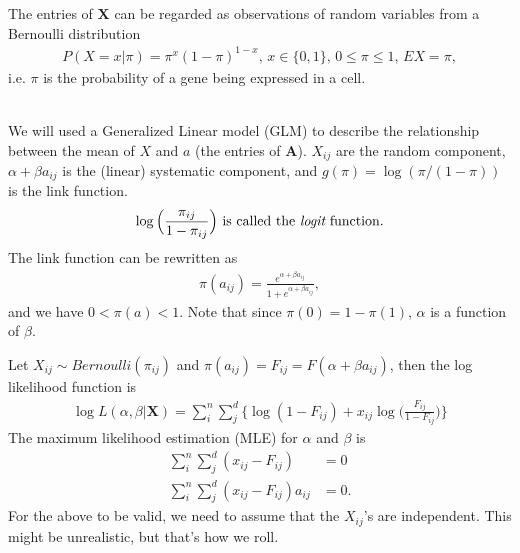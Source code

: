 \documentclass[12pt]{article}
\begin{document}
The entries of $\mathbf{X}$ can be regarded as observations of random variables from a Bernoulli distribution
\begin{align*}
  P(X = x|\pi) = \pi^x(1-\pi)^{1-x}, \, x \in \{0, 1\}, \, 0 \leq \pi \leq 1, \, EX = \pi, 
\end{align*}
i.e. $\pi$ is the probability of a gene being expressed in a cell. 

\vspace{3mm}

 \\
We will used a Generalized Linear model (GLM) to describe the relationship between the mean of $X$ and $a$ (the entries of $\mathbf{A}$).
$X_{ij}$ are the random component, $\alpha + \beta a_{ij}$ is the (linear) systematic component, and $g(\pi) = \log(\pi/(1-\pi))$ is the link function. 
\begin{align}
  \log \Big ( \frac{\pi_{ij}}{1-\pi_{ij}} \Big) \text{ is called the {\it logit} function.}
\end{align}
The link function can be rewritten as
\begin{align}
  \pi(a_{ij}) =  \frac{e^{\alpha+\beta a_{ij}}}{1+e^{\alpha+\beta a_{ij}}}, 
\end{align}
and we have $0 < \pi(a) < 1$.
Note that since $\pi(0) = 1-\pi(1)$, $\alpha$ is a function of $\beta$.


Let $X_{ij} \sim Bernoulli(\pi_{ij})$ and $\pi(a_{ij}) = F_{ij} = F(\alpha + \beta a_{ij})$, then the log likelihood function is
\begin{align}
  \log L(\alpha, \beta| \mathbf{X}) = \sum_{i}^{n} \sum_{j}^{d} \Big \{ \log (1-F_{ij}) + x_{ij} \log \big (\frac{F_{ij}}{1 - F_{ij}} \big ) \Big \}
\end{align}
The maximum likelihood estimation (MLE) for $\alpha$ and $\beta$ is 
\begin{align}
  \sum_{i}^{n} \sum_{j}^{d} (x_{ij} - F_{ij} ) & = 0 \\
  \sum_{i}^{n} \sum_{j}^{d} (x_{ij} - F_{ij}) a_{ij} & = 0.
\end{align}
For the above to be valid, we need to assume that the $X_{ij}$'s are independent. This might be unrealistic, but that's how we roll.
\end{document}
